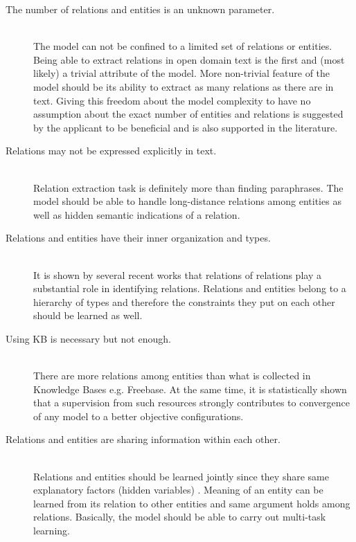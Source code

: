 \begin{description}
  
  \item[The number of relations and entities is an unknown parameter.] \hfill \\
  The model can not be confined to a limited set of relations or entities. Being able to extract relations in
  open domain text is the first and (most likely) a trivial attribute of the model. More non-trivial feature
  of the model should be its ability to extract as many relations as there are in text. 
  Giving this freedom
  about the model complexity to have no assumption about the exact number of entities and relations
  is suggested by the applicant to be beneficial 
   and is also supported in the literature.
   \cite{Mintz2009} \cite{Yates2007}  

  \item[Relations may not be expressed explicitly in text.] \hfill \\
  Relation extraction task is definitely more than finding paraphrases. The model should be able to handle
  long-distance relations among entities as well as hidden semantic indications of a relation. \cite{Poon2009}
  


  \item[Relations and entities have their inner organization and types.] \hfill \\
  It is shown by several recent works that relations of relations play a substantial role in identifying
  relations. Relations and entities belong to a hierarchy of types and therefore the constraints they put on each other
  should be learned as well.\cite{Yao2011} \cite{Alfonseca2012} \cite{Nakashole2012a}

  \item[Using KB is necessary but not enough.] \hfill \\
  There are more relations among entities than what is collected in 
  Knowledge Bases e.g. Freebase. At the same time, it is statistically shown that a supervision
  from such resources strongly contributes to convergence of any model to a better 
  objective configurations.\cite{Yao2011} \cite{Mintz2009}

  \item[Relations and entities are sharing information within each other.] \hfill \\
  Relations and entities should be learned jointly since they share same explanatory factors (hidden variables)
  . Meaning of an entity can be learned from its relation to other entities and same argument holds among relations.
  Basically, the model should be able to carry out multi-task learning. \cite{Yao2011} 
    
\end{description}
